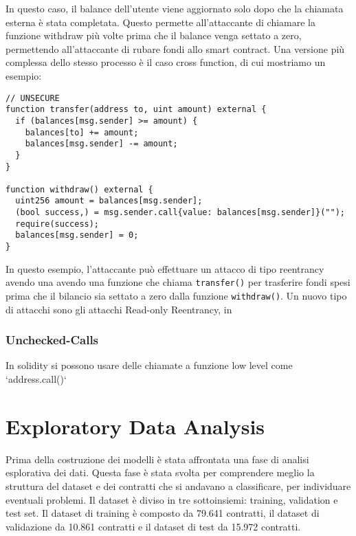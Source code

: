 \documentclass[../../Thesis.tex]{subfiles}
\begin{document}
In questo caso, il balance dell'utente viene aggiornato solo dopo che la chiamata esterna è stata completata. Questo permette all'attaccante di chiamare la funzione withdraw più volte prima che il balance venga settato a zero, permettendo all'attaccante di rubare fondi allo smart contract.
Una versione più complessa dello stesso processo è il caso cross function, di cui mostriamo un esempio:
\begin{lstlisting}[language=Solidity]
    // UNSECURE
function transfer(address to, uint amount) external {
  if (balances[msg.sender] >= amount) {
    balances[to] += amount;
    balances[msg.sender] -= amount;
  }
}

function withdraw() external {
  uint256 amount = balances[msg.sender];
  (bool success,) = msg.sender.call{value: balances[msg.sender]}("");
  require(success);
  balances[msg.sender] = 0;
}
\end{lstlisting}
In questo esempio, l'attaccante può effettuare un attacco di tipo reentrancy avendo una avendo una funzione che chiama \texttt{transfer()} per trasferire fondi spesi prima che il bilancio sia settato a zero dalla funzione \texttt{withdraw()}.
Un nuovo tipo di attacchi sono gli attacchi Read-only Reentrancy, in 
\subsubsection{Unchecked-Calls}
In solidity si possono usare delle chiamate a funzione low level come `address.call()`



\section{Exploratory Data Analysis}
Prima della costruzione dei modelli è stata affrontata una fase di analisi esplorativa dei dati. Questa fase è stata svolta per comprendere meglio la struttura del dataset e dei contratti che si andavano a classificare, per individuare eventuali problemi. 
Il dataset è diviso in tre sottoinsiemi: training, validation e test set.
Il dataset di training è composto da 79.641 contratti, il dataset di validazione da 10.861 contratti e il dataset di test da 15.972 contratti.
\end{document}
